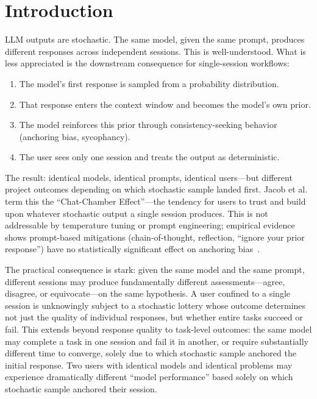 \documentclass[11pt]{article}
\begin{document}
\section{Introduction}
\label{sec:introduction}

LLM outputs are stochastic. The same model, given the same prompt, produces different responses across independent sessions. This is well-understood. What is less appreciated is the downstream consequence for single-session workflows:

\begin{enumerate}[label=\arabic*.]
  \item The model's first response is sampled from a probability distribution.
  \item That response enters the context window and becomes the model's own prior.
  \item The model reinforces this prior through consistency-seeking behavior (anchoring bias, sycophancy).
  \item The user sees only one session and treats the output as deterministic.
\end{enumerate}

The result: identical models, identical prompts, identical users---but different project outcomes depending on which stochastic sample landed first. Jacob et al.~\citep{jacob2025chatchamber} term this the ``Chat-Chamber Effect''---the tendency for users to trust and build upon whatever stochastic output a single session produces. This is not addressable by temperature tuning or prompt engineering; empirical evidence shows prompt-based mitigations (chain-of-thought, reflection, ``ignore your prior response'') have no statistically significant effect on anchoring bias~\citep{feng2026anchoring}.

The practical consequence is stark: given the same model and the same prompt, different sessions may produce fundamentally different assessments---agree, disagree, or equivocate---on the same hypothesis. A user confined to a single session is unknowingly subject to a stochastic lottery whose outcome determines not just the quality of individual responses, but whether entire tasks succeed or fail. This extends beyond response quality to task-level outcomes: the same model may complete a task in one session and fail it in another, or require substantially different time to converge, solely due to which stochastic sample anchored the initial response. Two users with identical models and identical problems may experience dramatically different ``model performance'' based solely on which stochastic sample anchored their session.
\end{document}
